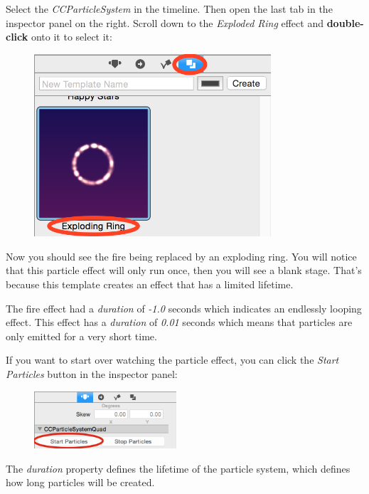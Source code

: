 \begin{leftbar}
Select the \textit{CCParticleSystem} in the timeline. Then open the last tab in
the inspector panel on the right. Scroll down to the \textit{Exploded Ring}
effect and \textbf{double-click} onto it to select it:

\begin{figure}[H]
  \centering
  \includegraphics[width=250pt]{images/Chapter9/select_exploded_ring.png}
\end{figure}
\end{leftbar}

Now you should see the fire being replaced by an exploding ring. You will notice
that this particle effect will only run once, then you will see a blank stage.
That's because this template creates an effect that has a limited lifetime.

The fire effect had a \textit{duration} of \textit{-1.0} seconds which indicates
an endlessly looping effect. This effect has a \textit{duration} of
\textit{0.01} seconds which means that particles are only emitted for a very
short time. 

If you want to start over watching the particle effect, you can click the
\textit{Start Particles} button in the inspector panel:
\begin{figure}[H]
  \centering
  \includegraphics[width=150pt]{images/Chapter9/start_particles.png}
\end{figure}

The \textit{duration} property defines the lifetime of the particle system,
which defines how long particles will be created.

